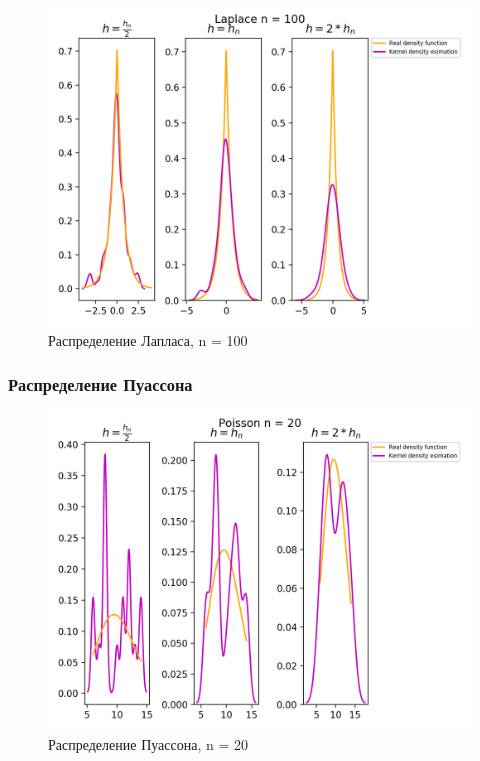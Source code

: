\begin{figure}[H]
	\begin{center}
		\includegraphics[scale=0.7]{fig/Laplace100_kde.png}
		\caption{Распределение Лапласа, n = 100} 
		\label{pic:pic_name}
	\end{center}
\end{figure}



\subsubsection{Распределение Пуассона}
\begin{figure}[H]
	\begin{center}
		\includegraphics[scale=0.7]{fig/Poisson20_kde.png}
		\caption{Распределение Пуассона, n = 20} 
		\label{pic:pic_name} 
	\end{center}
\end{figure}

